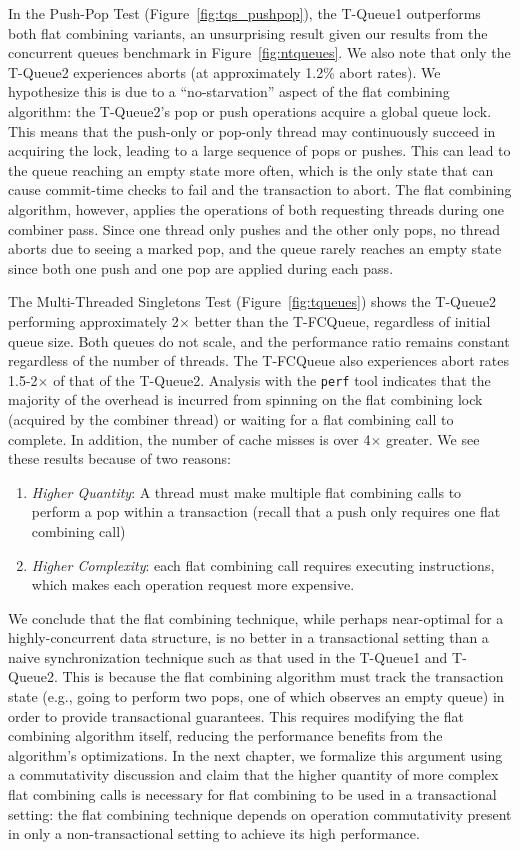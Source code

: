 In the Push-Pop Test (Figure~\ref{fig:tqs_pushpop}), the T-Queue1 outperforms both flat combining variants, an unsurprising result given our results from the concurrent queues benchmark in Figure~\ref{fig:ntqueues}. We also note that only the T-Queue2 experiences aborts (at approximately 1.2\% abort rates). We hypothesize this is due to a ``no-starvation'' aspect of the flat combining algorithm: the T-Queue2's pop or push operations acquire a global queue lock. This means that the push-only or pop-only thread may continuously succeed in acquiring the lock, leading to a large sequence of pops or pushes. This can lead to the queue reaching an empty state more often, which is the only state that can cause commit-time checks to fail and the transaction to abort. The flat combining algorithm, however, applies the operations of both requesting threads during one combiner pass. Since one thread only pushes and the other only pops, no thread aborts due to seeing a marked pop, and the queue rarely reaches an empty state since both one push and one pop are applied during each pass.

The Multi-Threaded Singletons Test (Figure~\ref{fig:tqueues}) shows the T-Queue2 performing approximately 2$\times$ better than the T-FCQueue, regardless of initial queue size. Both queues do not scale, and the performance ratio remains constant regardless of the number of threads. The T-FCQueue also experiences abort rates 1.5-2$\times$ of that of the T-Queue2.
Analysis with the \texttt{perf} tool indicates that the majority of the overhead is incurred from spinning on the flat combining lock (acquired by the combiner thread) or waiting for a flat combining call to complete. In addition, the number of cache misses is over 4$\times$ greater. We see these results because of two reasons:
\begin{enumerate}
\item \emph{Higher Quantity}: A thread must make multiple flat combining calls to perform a pop within a transaction (recall that a push only requires one flat combining call) 
\item \emph{Higher Complexity}: each flat combining call requires executing instructions, which makes each operation request more expensive.
\end{enumerate}

We conclude that the flat combining technique, while perhaps near-optimal for a highly-concurrent data structure, is no better in a transactional setting than a naive synchronization technique such as that used in the T-Queue1 and T-Queue2. This is because the flat combining algorithm must track the transaction state (e.g., going to perform two pops, one of which observes an empty queue) in order to provide transactional guarantees. This requires modifying the flat combining algorithm itself, reducing the performance benefits from the algorithm's optimizations. In the next chapter, we formalize this argument using a commutativity discussion and claim that the higher quantity of more complex flat combining calls is necessary for flat combining to be used in a transactional setting: the flat combining technique depends on operation commutativity present in only a non-transactional setting to achieve its high performance. 
